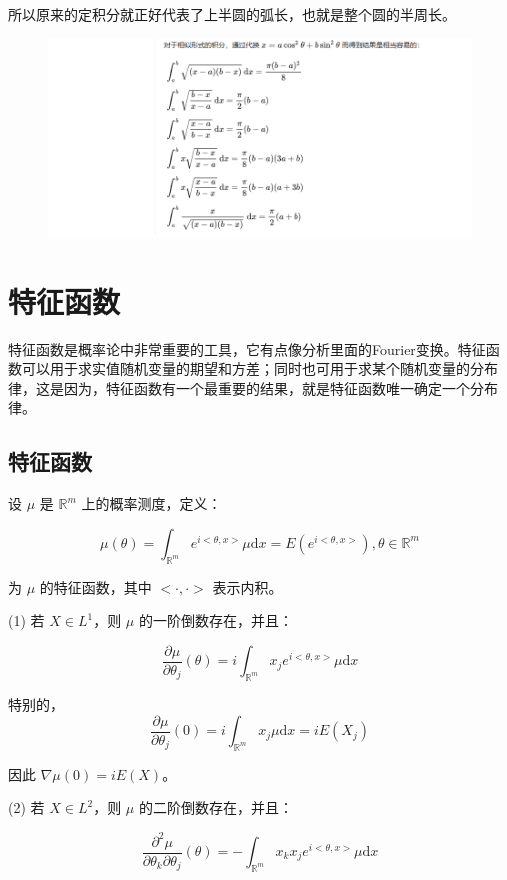 \documentclass[12pt, a4paper, oneside]{ctexbook}
\begin{document}
所以原来的定积分就正好代表了上半圆的弧长，也就是整个圆的半周长。

\begin{figure}[H]
  \centering
  \includegraphics[width=1\textwidth]{image/反正弦分布2.png}
  \label{fig:example}
\end{figure}

\chapter{特征函数}

特征函数是概率论中非常重要的工具，它有点像分析里面的Fourier变换。特征函数可以用于求实值随机变量的期望和方差；同时也可用于求某个随机变量的分布律，这是因为，特征函数有一个最重要的结果，就是特征函数唯一确定一个分布律。

\section{特征函数}

设 $\mu$ 是 $\mathbb{R} ^{m}$ 上的概率测度，定义：

$$
\mu(\theta) = \int_{\mathbb{R} ^{m}} e^{i<\theta, x>} \mu \mathrm{d}x = E(e^{i<\theta, x>}), \theta \in \mathbb{R}^{m}
$$

为 $\mu$ 的特征函数，其中 $<\cdot, \cdot>$ 表示内积。

(1) 若 $X \in L^{1}$，则 $\mu$ 的一阶倒数存在，并且：

$$
\dfrac{\partial \mu}{\partial \theta_{j}}(\theta) = i \int_{\mathbb{R}^{m}} x_j e^{i<\theta, x>} \mu \mathrm{d}x
$$

特别的，
$$
\dfrac{\partial \mu}{\partial \theta_{j}}(0) = i \int_{\mathbb{R}^{m}} x_j \mu \mathrm{d}x = iE(X_j)
$$

因此 $\nabla\mu(0) = iE(X)$。

(2) 若 $X \in L^{2}$，则 $\mu$ 的二阶倒数存在，并且：

$$
\dfrac{\partial^{2}\mu}{\partial \theta_k \partial \theta_j}(\theta) = -\int_{\mathbb{R}^{m}} x_k x_j  e^{i<\theta, x>} \mu \mathrm{d} x
$$
\end{document}
